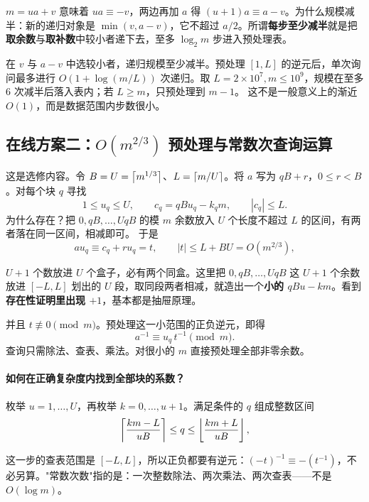 \begin{tip}[这个恒等式从哪来]
$m=ua+v$ 意味着 $ua\equiv-v$，两边再加 $a$ 得 $(u+1)a\equiv a-v$。为什么规模减半：新的递归对象是 $\min(v,a-v)$，它不超过 $a/2$。所谓\textbf{每步至少减半}就是把\textbf{取余数}与\textbf{取补数}中较小者递下去，至多 $\log_2 m$ 步进入预处理表。
\end{tip}

在 $v$ 与 $a-v$ 中选较小者，递归规模至少减半。预处理 $[1,L]$ 的逆元后，单次询问最多进行 $O(1+\log(m/L))$ 次递归。取 $L=2\times10^7,m\le10^9$，规模在至多 $6$ 次减半后落入表内；若 $L\ge m$，只预处理到 $m-1$。
这不是一般意义上的渐近 $O(1)$，而是数据范围内步数很小。

\subsection{在线方案二：\texorpdfstring{$O(m^{2/3})$}{O(m2/3)} 预处理与常数次查询运算}
这是选修内容。令 $B=U=\left\lceil m^{1/3}\right\rceil$、$L=\left\lceil m/U\right\rceil$。将 $a$ 写为 $qB+r$，$0\le r<B$。对每个块 $q$ 寻找
\[
1\le u_q\le U,\qquad c_q=qBu_q-k_qm,\qquad |c_q|\le L.
\]
为什么存在？把 $0,qB,\ldots,UqB$ 的模 $m$ 余数放入 $U$ 个长度不超过 $L$ 的区间，有两者落在同一区间，相减即可。
于是
\[
 a u_q\equiv c_q+ru_q=t,\qquad |t|\le L+BU=O(m^{2/3}),
\]

\begin{tip}[抽屉原理一句话]
$U+1$ 个数放进 $U$ 个盒子，必有两个同盒。这里把 $0,qB,\ldots,UqB$ 这 $U+1$ 个余数放进 $[-L,L]$ 划出的 $U$ 段，取同段两者相减，就造出一个\textbf{小的 $qBu-km$}。看到\textbf{存在性证明里出现 $+1$}，基本都是抽屉原理。
\end{tip}

并且 $t\not\equiv0\pmod m$。预处理这一小范围的正负逆元，即得
\[
 a^{-1}\equiv u_q\,t^{-1}\pmod m.
\]
查询只需除法、查表、乘法。对很小的 $m$ 直接预处理全部非零余数。

\paragraph{如何在正确复杂度内找到全部块的系数？}
枚举 $u=1,\ldots,U$，再枚举 $k=0,\ldots,u+1$。满足条件的 $q$ 组成整数区间
\[
 \left\lceil \frac{km-L}{uB}\right\rceil\le q\le\left\lfloor \frac{km+L}{uB}\right\rfloor,
\]

\begin{tip}
这一步的查表范围是 $[-L,L]$，所以正负都要有逆元：$(-t)^{-1}\equiv-(t^{-1})$，不必另算。"常数次数"指的是：一次整数除法、两次乘法、两次查表——不是 $O(\log m)$。
\end{tip}

